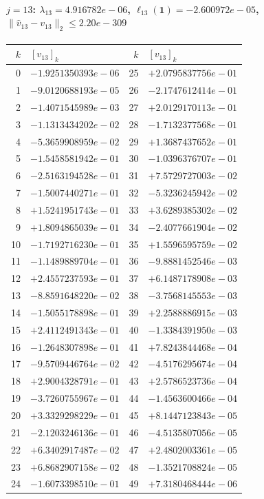 \paragraph{$j = 13$: $\lambda_{13} = 4.916782e-06$, \quad $\ell_{13}(\mathbf{1}) = -2.600972e-05$, \quad $\|\hat{v}_{13} - v_{13}\|_2 \leq 2.20e-309$}
\begin{center}
{\footnotesize
\begin{tabular}{r@{\;\;}l@{\quad}r@{\;\;}l}
\toprule
$k$ & $[v_{13}]_k$ & $k$ & $[v_{13}]_k$ \\
\midrule
0 & $-1.9251350393e-06$ & 25 & $+2.0795837756e-01$ \\
1 & $-9.0120688193e-05$ & 26 & $-2.1747612414e-01$ \\
2 & $-1.4071545989e-03$ & 27 & $+2.0129170113e-01$ \\
3 & $-1.1313434202e-02$ & 28 & $-1.7132377568e-01$ \\
4 & $-5.3659908959e-02$ & 29 & $+1.3687437652e-01$ \\
5 & $-1.5458581942e-01$ & 30 & $-1.0396376707e-01$ \\
6 & $-2.5163194528e-01$ & 31 & $+7.5729727003e-02$ \\
7 & $-1.5007440271e-01$ & 32 & $-5.3236245942e-02$ \\
8 & $+1.5241951743e-01$ & 33 & $+3.6289385302e-02$ \\
9 & $+1.8094865039e-01$ & 34 & $-2.4077661904e-02$ \\
10 & $-1.7192716230e-01$ & 35 & $+1.5596595759e-02$ \\
11 & $-1.1489889704e-01$ & 36 & $-9.8881452546e-03$ \\
12 & $+2.4557237593e-01$ & 37 & $+6.1487178908e-03$ \\
13 & $-8.8591648220e-02$ & 38 & $-3.7568145553e-03$ \\
14 & $-1.5055178898e-01$ & 39 & $+2.2588886915e-03$ \\
15 & $+2.4112491343e-01$ & 40 & $-1.3384391950e-03$ \\
16 & $-1.2648307898e-01$ & 41 & $+7.8243844468e-04$ \\
17 & $-9.5709446764e-02$ & 42 & $-4.5176295674e-04$ \\
18 & $+2.9004328791e-01$ & 43 & $+2.5786523736e-04$ \\
19 & $-3.7260755967e-01$ & 44 & $-1.4563600466e-04$ \\
20 & $+3.3329298229e-01$ & 45 & $+8.1447123843e-05$ \\
21 & $-2.1203246136e-01$ & 46 & $-4.5135807056e-05$ \\
22 & $+6.3402917487e-02$ & 47 & $+2.4802003361e-05$ \\
23 & $+6.8682907158e-02$ & 48 & $-1.3521708824e-05$ \\
24 & $-1.6073398510e-01$ & 49 & $+7.3180468444e-06$ \\
\bottomrule
\end{tabular}
}
\end{center}

